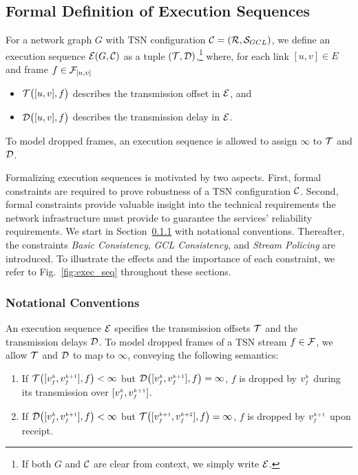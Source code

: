 

\subsection{Formal Definition of Execution Sequences}
For a network graph $G$ with TSN configuration $\Conf = (\R{}, \GCL{})$, we define an execution sequence $\E(G, \C)$ as a tuple $(\T{}, \D{})$,\footnote{If both $G$ and $\Conf$ are clear from context, we simply write $\E$.} where, for each link $[u,v] \in E$ and frame $f \in \TT_{[u,v]}$
\begin{itemize}
    \item $\T{[u,v],f}$ describes the transmission offset in $\E$, and
    \item $\D{[u,v],f}$ describes the transmission delay in $\E$.
\end{itemize}
To model dropped frames, an execution sequence is allowed to assign $\infty$ to $\T{}$ and $\D{}$.

Formalizing execution sequences is motivated by two aspects.
First, formal constraints are required to prove robustness of a TSN configuration $\Conf$.
Second, formal constraints provide valuable insight into the technical requirements the network infrastructure must provide to guarantee the services' reliability requirements.
We start in Section~\ref{sec:execution_sequences:notation} with notational conventions.
Thereafter, the constraints \textit{Basic Consistency}, \textit{GCL Consistency}, and \textit{Stream Policing} are introduced.
To illustrate the effects and the importance of each constraint, we refer to Fig.~\ref{fig:exec_seq} throughout these sections.

\subsubsection{Notational Conventions}\label{sec:execution_sequences:notation}
An execution sequence $\E$ specifies the transmission offsets $\T{}$ and the transmission delays $\D{}$. 
To model dropped frames of a TSN stream $f \in \TT$, we allow $\T{}$ and $\D{}$ to map to $\infty$, conveying the following semantics:
\begin{enumerate}[label=I\arabic*)]
  \item If $\T{[\v{k}{f}, \v{k+1}{f}],f} < \infty$ but $\D{[\v{k}{f}, \v{k+1}{f}],f} = \infty$, $f$ is dropped by $\v{k}{f}$ during its transmission over $[\v{k}{f}, \v{k+1}{f}]$.
  \item If $\D{[\v{k}{f}, \v{k+1}{f}],f} < \infty$ but $\T{[\v{k+1}{f}, \v{k+2}{f}],f} = \infty$, $f$ is dropped by $\v{k+1}{f}$ upon receipt.
\end{enumerate}

